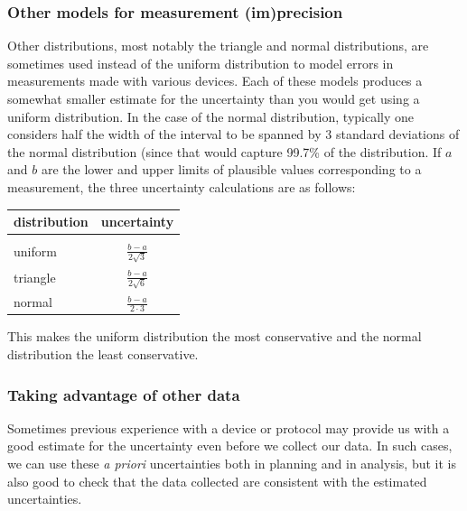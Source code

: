 \documentclass[twoside]{book}\usepackage[]{graphicx}\usepackage[]{xcolor}
\begin{document}
\subsubsection{Other models for measurement (im)precision}
Other distributions, most notably the triangle and normal distributions, are sometimes
used instead of the uniform distribution to model errors in measurements made
with various devices.  Each of these models produces a somewhat smaller estimate
for the uncertainty than you would get using a uniform distribution.  In the case of the normal distribution, typically one considers
half the width of the interval to be spanned by 3 standard deviations of the
normal distribution (since that would capture 99.7\% of the distribution.  If $a$ and $b$
are the lower and upper limits of plausible values corresponding to a measurement,
the three uncertainty calculations are as follows:

\begin{center}
	\begin{tabular}{lc}
		\hline
		distribution & uncertainty
		\\
		\hline
		\\[-3mm]
		uniform & $\displaystyle \frac{b-a}{2 \sqrt{3}}$
		\\[5mm]
		triangle & $\displaystyle \frac{b-a}{2 \sqrt{6}}$
		\\[5mm]
		normal & $\displaystyle \frac{b-a}{2 \cdot 3}$
		\\[3mm]
		\hline
	\end{tabular}
\end{center}
This makes the uniform distribution the most conservative and the normal distribution the least conservative.


\subsubsection{Taking advantage of other data}

Sometimes previous experience with a device or protocol may provide us with a good 
estimate for the uncertainty even before we collect our data.  In such cases, we can 
use these \emph{a priori} uncertainties both in planning and in analysis, but it is also
good to check that the data collected are consistent with the estimated uncertainties.
\end{document}
